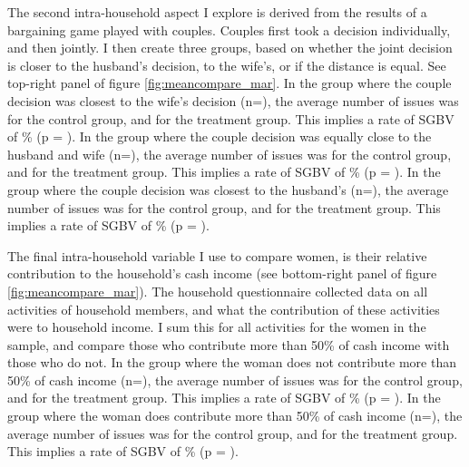 \documentclass[10pt,a4paper]{scrartcl} %
\begin{document}
The second intra-household aspect I explore is derived from the results of a bargaining game played with couples. Couples first took a decision individually, and then jointly. I then create three groups, based on whether the joint decision is closer to the husband's decision, to the wife's, or if the distance is equal. See top-right panel of figure \ref{fig:meancompare_mar}. In the group where the couple decision was closest to the wife's decision (n=), the average number of issues was  for the control group, and  for the treatment group. This implies a rate of SGBV of \% (p = ). In the group where the couple decision was equally close to the husband and wife (n=), the average number of issues was  for the control group, and  for the treatment group. This implies a rate of SGBV of \% (p = ). In the group where the couple decision was closest to the husband's (n=), the average number of issues was  for the control group, and  for the treatment group. This implies a rate of SGBV of \% (p = ).

The final intra-household variable I use to compare women, is their relative contribution to the household's cash income (see bottom-right panel of figure \ref{fig:meancompare_mar}). The household questionnaire collected data on all activities of household members, and what the contribution of these activities were to household income. I sum this for all activities for the women in the sample, and compare those who contribute more than 50\% of cash income with those who do not. In the group where the woman does not contribute more than 50\% of cash income (n=), the average number of issues was  for the control group, and  for the treatment group. This implies a rate of SGBV of \% (p = ). In the group where the woman does contribute more than 50\% of cash income (n=), the average number of issues was  for the control group, and  for the treatment group. This implies a rate of SGBV of \% (p = ). 
\end{document}

